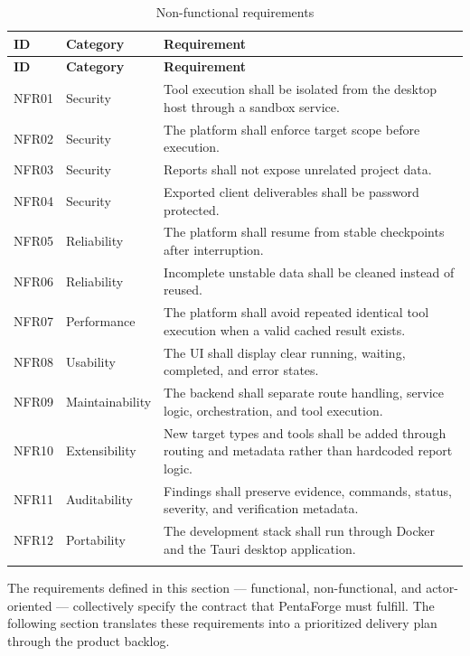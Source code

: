 \documentclass[12pt,a4paper]{report}
\begin{document}
\begin{longtable}{|p{}|p{}|p{}|}
\hline
\textbf{ID} & \textbf{Category} & \textbf{Requirement} \\
\hline
\endfirsthead
\hline
\textbf{ID} & \textbf{Category} & \textbf{Requirement} \\
\hline
\endhead
NFR01 & Security & Tool execution shall be isolated from the desktop host
through a sandbox service. \\
\hline
NFR02 & Security & The platform shall enforce target scope before
execution. \\
\hline
NFR03 & Security & Reports shall not expose unrelated project data. \\
\hline
NFR04 & Security & Exported client deliverables shall be password
protected. \\
\hline
NFR05 & Reliability & The platform shall resume from stable checkpoints
after interruption. \\
\hline
NFR06 & Reliability & Incomplete unstable data shall be cleaned instead of
reused. \\
\hline
NFR07 & Performance & The platform shall avoid repeated identical tool
execution when a valid cached result exists. \\
\hline
NFR08 & Usability & The UI shall display clear running, waiting, completed,
and error states. \\
\hline
NFR09 & Maintainability & The backend shall separate route handling, service
logic, orchestration, and tool execution. \\
\hline
NFR10 & Extensibility & New target types and tools shall be added through
routing and metadata rather than hardcoded report logic. \\
\hline
NFR11 & Auditability & Findings shall preserve evidence, commands, status,
severity, and verification metadata. \\
\hline
NFR12 & Portability & The development stack shall run through Docker and the
Tauri desktop application. \\
\hline
\caption{Non-functional requirements}
\label{tab:nonfunctional_requirements}
\end{longtable}

The requirements defined in this section --- functional, non-functional, and
actor-oriented --- collectively specify the contract that PentaForge must
fulfill. The following section translates these requirements into a
prioritized delivery plan through the product backlog.
\end{document}
